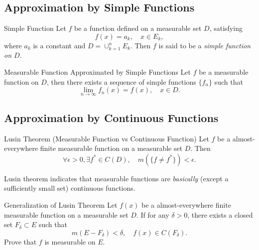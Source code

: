 \subsection{Approximation by Simple Functions}

\begin{definition}{Simple Function}{}
  Let $f$ be a function defined on a measurable set $D$, satisfying
  \begin{equation}
    f(x) = a_k, \quad x \in E_k,
  \end{equation}
  where $a_k$ is a constant and $D = \cup _{k = 1}^n E_k$.
  Then $f$ is said to be a \emph{simple function on $D$}.
\end{definition}

\begin{theorem}{Measurable Function Approximated by Simple Functions}{}
  Let $f$ be a measurable function on $D$,
  then there exists a sequence of simple functions $\{f_n\}$ such that
  \begin{equation}
    \lim \limits _{n \rightarrow \infty} f_n(x) = f(x), \quad x \in D.
  \end{equation}
\end{theorem}

\subsection{Approximation by Continuous Functions}

\begin{theorem}{Lusin Theorem (Measurable Function vs Continuous Function)}{}
  Let $f$ be a almost-everywhere finite measurable function on a measurable set
  $D$.
  Then
  \begin{equation}
    \forall \epsilon > 0, \exists f^{\ast} \in C(D), \quad
    m(\{f \neq f^{\ast}\}) < \epsilon.
  \end{equation}
\end{theorem}

\begin{note}
  Lusin theorem indicates that measurable functions are
  \emph{basically} (except a sufficiently small set) continuous functions.
\end{note}

\begin{example}{Generalization of Lusin Theorem}{}
  Let $f(x)$ be a almost-everywhere finite measurable function on a measurable set $D$.
  If for any $\delta > 0$, there exists a closed set $F_{\delta} \subset E$ such that
  \begin{equation}
    m (E - F_{\delta}) < \delta, \quad f(x) \in C(F_{\delta}).
  \end{equation}
  Prove that $f$ is measurable on $E$.
\end{example}

